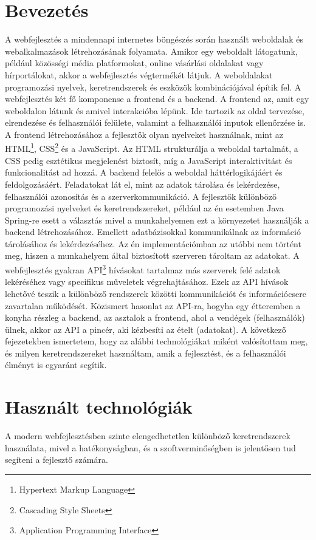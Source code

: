 \documentclass[a4paper,twoside]{article}
\begin{document}
\section{Bevezetés}
A webfejlesztés a mindennapi internetes böngészés során használt weboldalak és
webalkalmazások létrehozásának folyamata. Amikor egy weboldalt látogatunk, például
közösségi média platformokat, online vásárlási oldalakat vagy hírportálokat, akkor a
webfejlesztés végtermékét látjuk.
A weboldalakat programozási nyelvek, keretrendszerek és eszközök kombinációjával építik
fel. A webfejlesztés két fő komponense a frontend és a backend.
A frontend az, amit egy weboldalon látunk és amivel interakcióba lépünk. Ide tartozik az
oldal tervezése, elrendezése és felhasználói felülete, valamint a felhasználói inputok
ellenőrzése is. A frontend létrehozásához a fejlesztők olyan nyelveket használnak, mint az
HTML\footnote{Hypertext Markup Language}, CSS\footnote{Cascading Style Sheets} és a JavaScript. Az
HTML strukturálja a weboldal tartalmát, a CSS pedig esztétikus megjelenést biztosít, míg a
JavaScript interaktivitást és funkcionalitást ad hozzá.
A backend felelős a weboldal háttérlogikájáért és feldolgozásáért. Feladatokat lát el, mint az
adatok tárolása és lekérdezése, felhasználói azonosítás és a szerverkommunikáció. A
fejlesztők különböző programozási nyelveket és keretrendszereket, például az én esetemben
Java Spring\cite{javaspring}-re esett a választás mivel a munkahelyemen ezt a környezetet használják a
backend létrehozásához. Emellett adatbázisokkal kommunikálnak az információ tárolásához
és lekérdezéséhez. Az én implementációmban az utóbbi nem történt meg, hiszen a
munkahelyem által biztosított szerveren tároltam az adatokat.
A webfejlesztés gyakran API\footnote{Application Programming Interface} hívásokat tartalmaz más
szerverek felé adatok lekéréséhez vagy specifikus műveletek végrehajtásához. Ezek az API
hívások lehetővé teszik a különböző rendszerek közötti kommunikációt és információcsere
zavartalan működését. Közismert hasonlat az API-ra, hogyha egy étteremben a konyha
részleg a backend, az asztalok a frontend, ahol a vendégek (felhasználók) ülnek, akkor az API
a pincér, aki kézbesíti az ételt (adatokat).
A következő fejezetekben ismertetem, hogy az alábbi technológiákat miként valósítottam
meg, és milyen keretrendszereket használtam, amik a fejlesztést, és a felhasználói élményt is
egyaránt segítik.
\newpage
\section{Használt technológiák}
A modern webfejlesztésben szinte elengedhetetlen különböző keretrendszerek használata,
mivel a hatékonyságban, és a szoftverminőségben is jelentősen tud segíteni a fejlesztő
számára.
\end{document}
